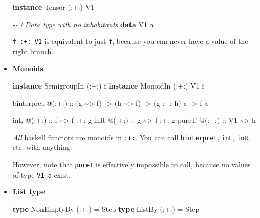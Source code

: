 \documentclass[]{article}
\newenvironment{Shaded}{}{}
\newcommand{\CommentTok}[1]{\textcolor[rgb]{0.38,0.63,0.69}{\textit{#1}}}
\newcommand{\DataTypeTok}[1]{\textcolor[rgb]{0.56,0.13,0.00}{#1}}
\newcommand{\KeywordTok}[1]{\textcolor[rgb]{0.00,0.44,0.13}{\textbf{#1}}}
\newcommand{\NormalTok}[1]{#1}
\newcommand{\OperatorTok}[1]{\textcolor[rgb]{0.40,0.40,0.40}{#1}}
\newcommand{\OtherTok}[1]{\textcolor[rgb]{0.00,0.44,0.13}{#1}}
\begin{document}
\begin{itemize}
\begin{Shaded}
\begin{Highlighting}[]
\KeywordTok{instance} \DataTypeTok{Tensor}\NormalTok{ (}\OperatorTok{:+:}\NormalTok{) }\DataTypeTok{V1}

\CommentTok{{-}{-} | Data type with no inhabitants}
\KeywordTok{data} \DataTypeTok{V1}\NormalTok{ a}
\end{Highlighting}
\end{Shaded}

  \texttt{f\ :+:\ V1} is equivalent to just \texttt{f}, because you can never
  have a value of the right branch.
\item
  \textbf{Monoids}

\begin{Shaded}
\begin{Highlighting}[]
\KeywordTok{instance} \DataTypeTok{SemigroupIn}\NormalTok{ (}\OperatorTok{:+:}\NormalTok{) f}
\KeywordTok{instance} \DataTypeTok{MonoidIn}\NormalTok{    (}\OperatorTok{:+:}\NormalTok{) }\DataTypeTok{V1}\NormalTok{ f}

\NormalTok{binterpret }\OperatorTok{@}\NormalTok{(}\OperatorTok{:+:}\NormalTok{)}
\OtherTok{    ::}\NormalTok{ (g }\OperatorTok{\textasciitilde{}>}\NormalTok{ f)}
    \OtherTok{{-}>}\NormalTok{ (h }\OperatorTok{\textasciitilde{}>}\NormalTok{ f)}
    \OtherTok{{-}>}\NormalTok{ (g }\OperatorTok{:+:}\NormalTok{ h) a}
    \OtherTok{{-}>}\NormalTok{ f a}

\NormalTok{inL   }\OperatorTok{@}\OtherTok{(:+:) ::}\NormalTok{ f     }\OperatorTok{\textasciitilde{}>}\NormalTok{ f }\OperatorTok{:+:}\NormalTok{ g}
\NormalTok{inR   }\OperatorTok{@}\OtherTok{(:+:) ::}\NormalTok{ g     }\OperatorTok{\textasciitilde{}>}\NormalTok{ f }\OperatorTok{:+:}\NormalTok{ g}
\NormalTok{pureT }\OperatorTok{@}\OtherTok{(:+:) ::} \DataTypeTok{V1} \OperatorTok{\textasciitilde{}>}\NormalTok{ h}
\end{Highlighting}
\end{Shaded}

  \emph{All} haskell functors are monoids in \texttt{:+:}. You can call
  \texttt{binterpret}, \texttt{inL}, \texttt{inR}, etc. with anything.

  However, note that \texttt{pureT} is effectively impossible to call, because
  no values of type \texttt{V1\ a} exist.
\item
  \textbf{List type}

\begin{Shaded}
\begin{Highlighting}[]
\KeywordTok{type} \DataTypeTok{NonEmptyBy}\NormalTok{ (}\OperatorTok{:+:}\NormalTok{) }\OtherTok{=} \DataTypeTok{Step}
\KeywordTok{type} \DataTypeTok{ListBy}\NormalTok{     (}\OperatorTok{:+:}\NormalTok{) }\OtherTok{=} \DataTypeTok{Step}
\end{Highlighting}
\end{Shaded}


\end{itemize}
\end{document}
